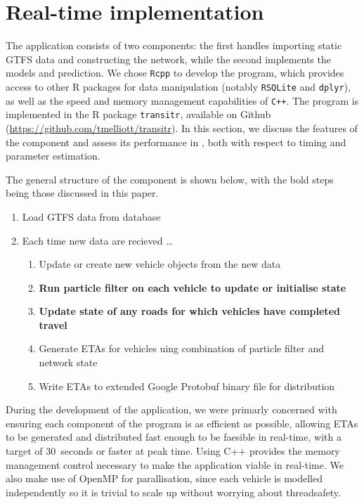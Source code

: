 \section{Real-time implementation}
\label{sec:rt}

The application consists of two components:
the first handles importing static GTFS data and constructing the network,
while the second implements the \rt models and prediction.
We chose \verb+Rcpp+ to develop the program,
which provides access to other R packages for data manipulation 
(notably \verb+RSQLite+ and \verb+dplyr+),
as well as the speed and memory management capabilities of \verb|C++|. 
The program is implemented in the R package
\verb+transitr+, available on Github (\url{https://github.com/tmelliott/transitr}).
In this section, we discuss the features of the \rt component
and assess its performance in \rt,
both with respect to timing and parameter estimation.

The general structure of the \rt component is shown below,
with the bold steps being those discussed in this paper.
\begin{enumerate}
\item Load GTFS data from database
\item Each time new data are recieved \ldots
\begin{enumerate}
    \item Update or create new vehicle objects from the new data
    \item \textbf{Run particle filter on each vehicle to update or initialise state}
    \item \textbf{Update state of any roads for which vehicles 
        have completed travel}
    \item Generate ETAs for vehicles uing combination of particle filter and network state
    \item Write ETAs to extended Google Protobuf binary file for distribution
\end{enumerate}
\end{enumerate}


During the development of the application,
we were primarly concerned with ensuring each component of the program
is as efficient as possible,
allowing ETAs to be generated and distributed fast enough to be faesible in real-time,
with a target of 30~seconds or faster at peak time.
Using C++ provides the memory management control necessary to make the application
viable in real-time.
We also make use of OpenMP for parallisation,
since each vehicle is modelled independently so it is trivial to scale up without
worrying about threadsafety.


